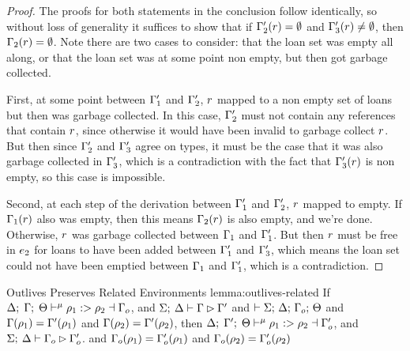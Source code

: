 \begin{proof}
  The proofs for both statements in the conclusion follow identically, so
  without loss of generality it suffices to show that if
  $\Gamma_2^\prime(r) = \emptyset$ and $\Gamma_3^\prime(r)
  \neq \emptyset$, then $\Gamma_2(r) = \emptyset$. Note there are two
  cases to consider: that the loan set was empty all along, or that the loan set
  was at some point non empty, but then got garbage collected.

  First, at some point between $\Gamma_1^\prime$ and $\Gamma_2^\prime$,
  $r$ mapped to a non empty set of loans but then was garbage collected.
  In this case, $\Gamma_2^\prime$ must not contain any references that
  contain $r$, since otherwise it would have been invalid to garbage
  collect $r$. But then since $\Gamma_2^\prime$ and
  $\Gamma_3^\prime$ agree on types, it must be the case that it was also
  garbage collected in $\Gamma_3^\prime$, which is a contradiction with the
  fact that $\Gamma_3^\prime(r)$ is non empty, so this case is
  impossible.

  Second, at each step of the derivation between $\Gamma_1^\prime$ and
  $\Gamma_2^\prime$, $r$ mapped to empty. If $\Gamma_1(r)$
  also was empty, then this means $\Gamma_2(r)$ is also empty, and
  we're done. Otherwise, $r$ was garbage collected between $\Gamma_1$
  and $\Gamma_1^\prime$. But then $r$ must be free in $e_2$ for
  loans to have been added between $\Gamma_1^\prime$ and
  $\Gamma_3^\prime$, which means the loan set could not have been emptied
  between $\Gamma_1$ and $\Gamma_1^\prime$, which is a contradiction.
\end{proof}

\begin{oxlemma}{Outlives Preserves Related Environments}
  {lemma:outlives-related} If
  $\Delta; \; \Gamma; \; \Theta \vdash^{\mu} \rho_1 :> \rho_2 \dashv \Gamma_o$, and
  $\Sigma; \: \Delta \vdash \Gamma \rhd \Gamma^\prime$ and
  $\vdash \Sigma; \, \Delta; \, \Gamma_o; \, \Theta$ and
  $\Gamma(\rho_1) = \Gamma^\prime(\rho_1)$ and $\Gamma(\rho_2)
  = \Gamma^\prime(\rho_2)$, then
  $\Delta; \; \Gamma^\prime; \; \Theta \vdash^{\mu} \rho_1 :> \rho_2 \dashv \Gamma_o^\prime$,
  and
  $\Sigma; \: \Delta \vdash \Gamma_o \rhd \Gamma_o^\prime$.
  and $\Gamma_o(\rho_1) = \Gamma_o^\prime(\rho_1)$ and
  $\Gamma_o(\rho_2) = \Gamma_o^\prime(\rho_2)$
\end{oxlemma}

